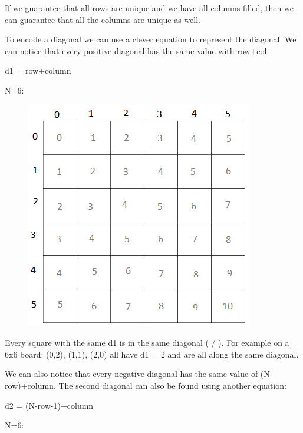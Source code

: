 \documentclass[11pt,oneside]{book}
\makeatletter
\def\maxwidth#1{\ifdim\Gin@nat@width>#1 #1\else\Gin@nat@width\fi}
\makeatother
\begin{document}
If we guarantee that all rows are unique and we have all columns filled, then we can guarantee that all the columns are unique as well.

To encode a diagonal we can use a clever equation to represent the diagonal. We can notice that every positive diagonal has the same value with row+col.

d1 = row+column

N=6:

\vspace{5px}\begin{figure}[H]\centering
        \includegraphics[width=0.66\maxwidth{\textwidth}]{nqueen1.png}
        \end{figure}

Every square with the same d1 is in the same diagonal ( / ). For example on a 6x6 board: (0,2), (1,1), (2,0) all have d1 = 2 and are all along the same diagonal.

We can also notice that every negative diagonal has the same value of (N-row)+column. The second diagonal can also be found using another equation:

d2 = (N-row-1)+column

N=6:
\end{document}
